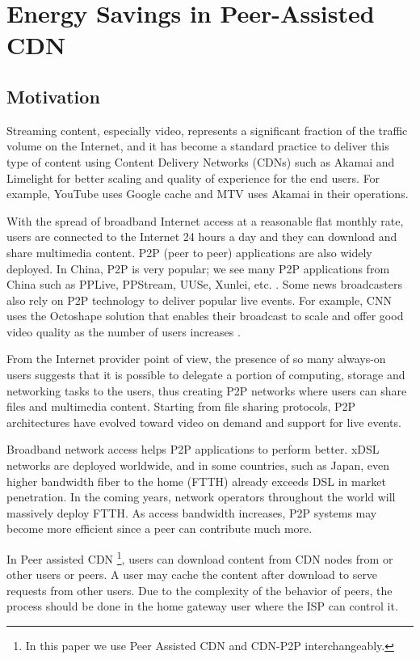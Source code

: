 \chapter{Energy Savings in Peer-Assisted CDN}

\section{Motivation}
Streaming content, especially video, represents a significant fraction of the traffic volume on the Internet, and it has become a standard practice to deliver this type of content using Content Delivery Networks (CDNs) such as Akamai and Limelight for better scaling and quality of experience for the end users.  
For example, YouTube uses Google cache and MTV uses Akamai in their operations.

With the spread of broadband Internet access at a reasonable flat monthly rate, users are connected to the Internet 24 hours a day and they can download and share multimedia content.  
P2P (peer to peer) applications are also widely deployed.  In China, P2P is very popular; we see many P2P applications from China such as PPLive, PPStream, UUSe, Xunlei, etc. \cite{Vu:2010:UOC:1865106.1865115}.  
Some news broadcasters also rely on P2P technology to deliver popular live events.  
For example, CNN uses the Octoshape solution that enables their broadcast to scale and offer good video quality as the number of users increases \cite{octoshape}.

From the Internet provider point of view, the presence of so many always-on users suggests that it is possible to delegate a portion of computing, storage and networking tasks to the users, thus creating P2P networks where users can share files and multimedia content. 
Starting from file sharing protocols, P2P architectures have evolved toward video on demand and support for live events.

Broadband network access helps P2P applications to perform better. 
xDSL networks are deployed worldwide, and in some countries, such as Japan, even higher bandwidth fiber to the home (FTTH) already exceeds DSL in market penetration. 
In the coming years, network operators throughout the world will massively deploy FTTH.  
As access bandwidth increases, P2P systems may become more efficient since a peer can contribute much more.

In Peer assisted CDN \footnote{In this paper we use Peer Assisted CDN and CDN-P2P interchangeably.}, users can download content from CDN nodes from or other users or peers. 
A user may cache the content after download to serve requests from other users. 
Due to the complexity of the behavior of peers, the process should be done in the home gateway user where the ISP can control it.

